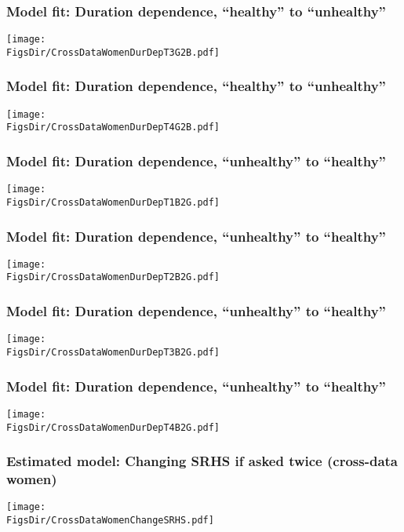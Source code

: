 \documentclass[aspectratio=169]{beamer}
\newcommand{\FigsDir}{../Figures}
\begin{document}
\begin{frame}\frametitle{Model fit: Duration dependence, ``healthy'' to ``unhealthy''}
\begin{center}
	\texttt{[image: \\FigsDir/CrossDataWomenDurDepT3G2B.pdf]}
\end{center}
\end{frame}

\begin{frame}\frametitle{Model fit: Duration dependence, ``healthy'' to ``unhealthy''}
\begin{center}
	\texttt{[image: \\FigsDir/CrossDataWomenDurDepT4G2B.pdf]}
\end{center}
\end{frame}

\begin{frame}\frametitle{Model fit: Duration dependence, ``unhealthy'' to ``healthy''}
\begin{center}
	\texttt{[image: \\FigsDir/CrossDataWomenDurDepT1B2G.pdf]}
\end{center}
\end{frame}

\begin{frame}\frametitle{Model fit: Duration dependence, ``unhealthy'' to ``healthy''}
\begin{center}
	\texttt{[image: \\FigsDir/CrossDataWomenDurDepT2B2G.pdf]}
\end{center}
\end{frame}

\begin{frame}\frametitle{Model fit: Duration dependence, ``unhealthy'' to ``healthy''}
\begin{center}
	\texttt{[image: \\FigsDir/CrossDataWomenDurDepT3B2G.pdf]}
\end{center}
\end{frame}

\begin{frame}\frametitle{Model fit: Duration dependence, ``unhealthy'' to ``healthy''}
\begin{center}
\texttt{[image: \\FigsDir/CrossDataWomenDurDepT4B2G.pdf]}
\end{center}
\end{frame}

\begin{frame}\frametitle{Estimated model: Changing SRHS if asked twice (cross-data women)}
\begin{center}
	\texttt{[image: \\FigsDir/CrossDataWomenChangeSRHS.pdf]}
\end{center}
\end{frame}
\end{document}
